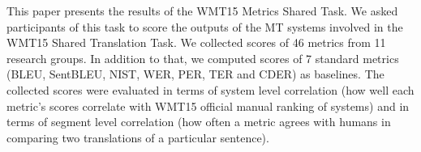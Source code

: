 This paper presents the results of the WMT15 Metrics Shared Task. We asked participants of this task to score the outputs of the MT systems involved in the WMT15 Shared Translation Task. We collected scores of 46 metrics from 11 research groups. In addition to that, we computed scores of 7 standard metrics (BLEU, SentBLEU, NIST, WER, PER, TER and CDER) as baselines. The collected scores were evaluated in terms of system level correlation (how well each metric's scores correlate with WMT15 official manual ranking of systems) and in terms of segment level correlation (how often a metric agrees with humans in comparing two translations of a particular sentence).
